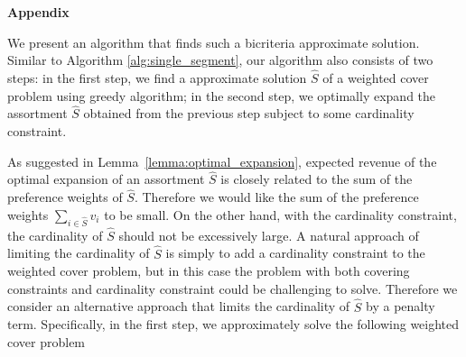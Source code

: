 \documentclass[msom,non-blindrev]{informs3} %
\theoremstyle{definition}
\begin{document}
\begin{appendices}{\Large \noindent\textbf{Appendix}}
{We present an algorithm that finds such a bicriteria approximate solution. Similar to Algorithm \ref{alg:single_segment}, our algorithm also consists of two steps: in the first step, we find a approximate solution $\hat{S}$ of a weighted cover problem using greedy algorithm; in the second step, we optimally expand the assortment $\hat{S}$ obtained from the previous step subject to some cardinality constraint. 

As suggested in Lemma~\ref{lemma:optimal_expansion}, expected revenue of the optimal expansion of an assortment $\hat{S}$ is closely related to the sum of the preference weights of $\hat{S}$. Therefore we would like the sum of the preference weights $\sum_{i\in \hat{S}}v_i$ to be small. On the other hand, with the cardinality constraint, the cardinality of $\hat{S}$ should not be excessively large. A natural approach of limiting the cardinality of $\hat{S}$ is simply to add a cardinality constraint to the weighted cover problem, but in this case the problem with both covering constraints and cardinality constraint could be challenging to solve. Therefore we consider an alternative approach that limits the cardinality of $\hat{S}$ by a penalty term. Specifically, in the first step, we approximately solve the following weighted cover problem

}
\end{appendices}
\end{document}
